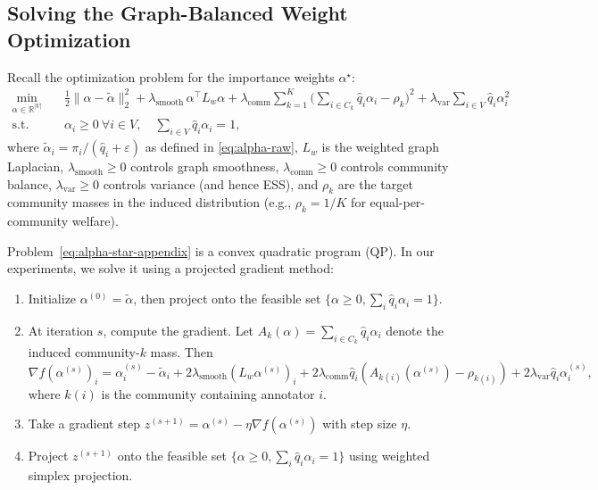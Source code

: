 \documentclass{article}
\theoremstyle{plain}
\theoremstyle{definition}
\theoremstyle{remark}
\begin{document}
\subsection{Solving the Graph-Balanced Weight Optimization}
\label{app:wstar-details}

Recall the optimization problem for the importance weights $\alpha^\star$:
\begin{equation}
\begin{aligned}
    \min_{\alpha \in \mathbb{R}^{|V|}}
    \quad &
    \frac{1}{2} \|\alpha - \tilde\alpha\|_2^2
    + \lambda_{\text{smooth}} \, \alpha^\top L_w \alpha
    + \lambda_{\text{comm}} \sum_{k=1}^{K}
      \Big( \sum_{i \in C_k} \hat q_i \alpha_i - \rho_k \Big)^2
    + \lambda_{\text{var}} \sum_{i \in V} \hat q_i \alpha_i^2
    \\
    \text{s.t.}\quad
    & \alpha_i \ge 0 \ \forall i \in V,
    \quad
    \sum_{i \in V} \hat q_i \alpha_i = 1,
\end{aligned}
\label{eq:alpha-star-appendix}
\end{equation}
where $\tilde\alpha_i = \pi_i / (\hat q_i + \varepsilon)$ as defined in
\eqref{eq:alpha-raw}, $L_w$ is the weighted graph Laplacian, $\lambda_{\text{smooth}} \ge 0$
controls graph smoothness, $\lambda_{\text{comm}} \ge 0$ controls community
balance, $\lambda_{\text{var}} \ge 0$ controls variance (and hence ESS),
and $\rho_k$ are the target community masses in the induced distribution
(e.g., $\rho_k = 1/K$ for equal-per-community welfare).

Problem~\eqref{eq:alpha-star-appendix} is a convex quadratic program (QP).
In our experiments, we solve it using a projected gradient method:

\begin{enumerate}
    \item Initialize $\alpha^{(0)} = \tilde\alpha$, then project onto
    the feasible set $\{\alpha \ge 0, \sum_i \hat q_i \alpha_i = 1\}$.
    \item At iteration $s$, compute the gradient. Let
    $A_k(\alpha) = \sum_{i \in C_k} \hat q_i \alpha_i$ denote the induced
    community-$k$ mass. Then
    \begin{equation}
        \nabla f(\alpha^{(s)})_i
        = \alpha_i^{(s)} - \tilde\alpha_i
        + 2 \lambda_{\text{smooth}} (L_w \alpha^{(s)})_i
        + 2 \lambda_{\text{comm}} \hat q_i (A_{k(i)}(\alpha^{(s)}) - \rho_{k(i)})
        + 2 \lambda_{\text{var}} \hat q_i \alpha_i^{(s)},
    \end{equation}
    where $k(i)$ is the community containing annotator $i$.
    \item Take a gradient step
    $z^{(s+1)} = \alpha^{(s)} - \eta \nabla f(\alpha^{(s)})$ with step size
    $\eta$.
    \item Project $z^{(s+1)}$ onto the feasible set
    $\{\alpha \ge 0, \sum_i \hat q_i \alpha_i = 1\}$ using weighted simplex
    projection.
\end{enumerate}
\end{document}
